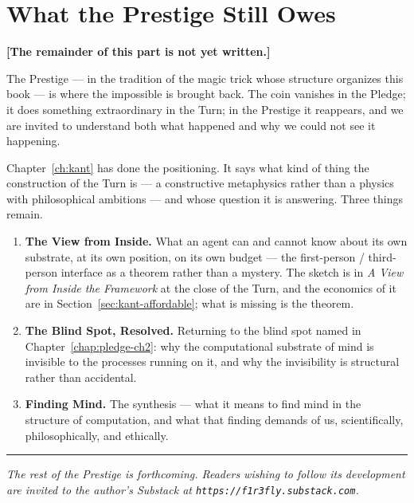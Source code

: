\chapter*{What the Prestige Still Owes}

\noindent\textbf{[The remainder of this part is not yet written.]}

\bigskip

The Prestige --- in the tradition of the magic trick whose structure
organizes this book --- is where the impossible is brought back.
The coin vanishes in the Pledge; it does something extraordinary in
the Turn; in the Prestige it reappears, and we are invited to
understand both what happened and why we could not see it
happening.

Chapter~\ref{ch:kant} has done the positioning.
It says what kind of thing the construction of the Turn is --- a
constructive metaphysics rather than a physics with philosophical
ambitions --- and whose question it is answering.
Three things remain.

\begin{enumerate}
  \item \textbf{The View from Inside.} What an agent can and cannot
        know about its own substrate, at its own position, on its
        own budget --- the first-person / third-person interface as
        a theorem rather than a mystery.
        The sketch is in \emph{A View from Inside the Framework} at
        the close of the Turn, and the economics of it are in
        Section~\ref{sec:kant-affordable}; what is missing is the
        theorem.
  \item \textbf{The Blind Spot, Resolved.} Returning to the blind
        spot named in Chapter~\ref{chap:pledge-ch2}: why the
        computational substrate of mind is invisible to the
        processes running on it, and why the invisibility is
        structural rather than accidental.
  \item \textbf{Finding Mind.} The synthesis --- what it means to
        find mind in the structure of computation, and what that
        finding demands of us, scientifically, philosophically, and
        ethically.
\end{enumerate}

\bigskip
\noindent\hrule
\bigskip

\noindent\textit{The rest of the Prestige is forthcoming.
Readers wishing to follow its development are invited to the
author's Substack at \texttt{https://f1r3fly.substack.com}.}
